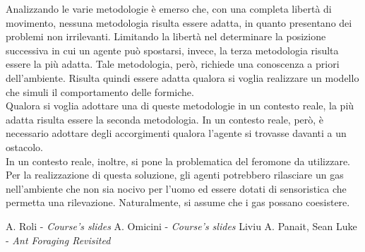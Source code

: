 \documentclass[12pt,a4paper,openright,twoside]{report}
\begin{document}
Analizzando le varie metodologie è emerso che, con una completa libertà di movimento, nessuna metodologia risulta essere adatta, in quanto presentano dei problemi non irrilevanti. Limitando la libertà nel determinare la posizione successiva in cui un agente può spostarsi, invece, la terza metodologia risulta essere la più adatta. Tale metodologia, però, richiede una conoscenza a priori dell'ambiente. Risulta quindi essere adatta qualora si voglia realizzare un modello che simuli il comportamento delle formiche.\\
Qualora si voglia adottare una di queste metodologie in un contesto reale, la più adatta risulta essere la seconda metodologia. In un contesto reale, però, è necessario adottare degli accorgimenti qualora l'agente si trovasse davanti a un ostacolo.\\
In un contesto reale, inoltre, si pone la problematica del feromone da utilizzare. Per la realizzazione di questa soluzione, gli agenti potrebbero rilasciare un gas nell'ambiente che non sia nocivo per l'uomo ed essere dotati di sensoristica che permetta una rilevazione. Naturalmente, si assume che i gas possano coesistere.

	\clearpage{\pagestyle{empty}\cleardoublepage}
	\begin{thebibliography}{90}             %
		\rhead[\fancyplain{}{\bfseries \leftmark}]{\fancyplain{}{\bfseries
				\thepage}}
		 A. Roli - \textit{Course's slides}
		 A. Omicini - \textit{Course's slides}  
		 Liviu A. Panait, Sean Luke - \textit{Ant Foraging Revisited}
	\end{thebibliography}
\end{document}
